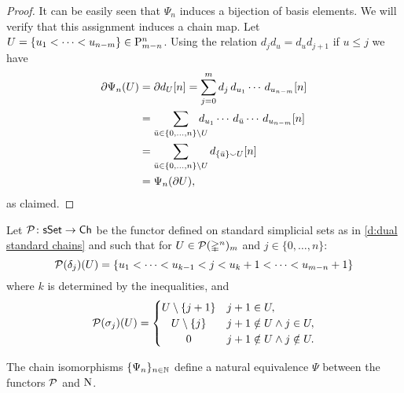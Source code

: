 \begin{proof}
	It can be easily seen that $\Psi_n$ induces a bijection of basis elements.
	We will verify that this assignment induces a chain map.
	Let $U = \{u_1 < \cdots < u_{n-m}\} \in \mathrm{P}_{m-n}^n$.
	Using the relation $d_jd_u = d_ud_{j+1}$ if $u \leq j$ we have
	\begin{align*}
	\partial \Psi_n(U) &=
	\partial d_U[n] =
	\sum_{j=0}^{m} d_j\, d_{u_1} \cdots\, d_{u_{n-m}}[n] \\ &=
	\sum_{\bar u \in \{0, \dots, n\} \setminus U}
	\hspace*{-10pt} d_{u_1} \cdots\, d_{\bar{u}} \cdots\, d_{u_{n-m}}[n] \\ &=
	\sum_{\bar u \in \{0, \dots, n\} \setminus U} d_{\{\bar u\} \union U}[n] \\ &=
	\Psi_n(\partial U),
	\end{align*}
	as claimed.
\end{proof}


\begin{definition}
	Let $\mathcal{P} \colon \mathsf{sSet} \to \mathsf{Ch}$ be the functor defined on standard simplicial sets as in \cref{d:dual standard chains} and such that for $U \in \mathcal{P}(\mathbb{\Delta}^n)_m$ and $j \in \{0, \dots, n\}$:
	\[
	\mathcal{P}(\delta_j)(U) = \{ u_1 < \dots < u_{k-1} < j < u_k+1 < \dots < u_{m-n}+1 \}
	\]
	where $k$ is determined by the inequalities, and
	\begin{equation} \label{e:action of P on a codegeneracy}
	\cP(\sigma_j)(U) = \begin{cases}
	U \setminus \{j+1\} & j+1 \in U, \\
	\hfil U \setminus \{j\} & j+1 \notin U \wedge j \in U, \\
	\hfil 0 & j+1 \notin U \wedge j \notin U.
	\end{cases}
	\end{equation}
\end{definition}

\begin{lemma}
	The chain isomorphisms $\{\Psi_n\}_{n \in \mathbb{N}}$ define a natural equivalence $\Psi$ between the functors $\mathcal{P}$ and $\operatorname{N}$.
\end{lemma}

